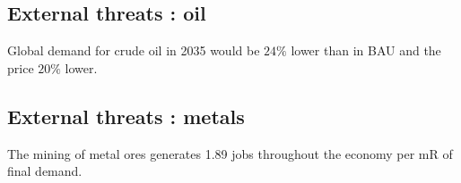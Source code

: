 \documentclass[12pt,english]{article}
\begin{document}
\citep{LandTransp2014}

\citep{P7000_2013}


\subsection{External threats : oil}

Global demand for crude oil in 2035 would be $24\%$ lower than in BAU and the price $20\%$ lower. 


\subsection{External threats : metals}

The mining of metal ores generates 1.89 jobs throughout the economy per mR of final demand. 

\newpage


\clearpage
\end{document}
